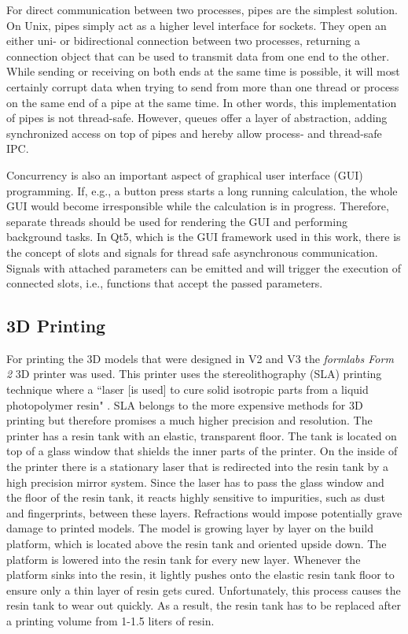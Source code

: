 \documentclass[12pt]{article}
\begin{document}
For direct communication between two processes, pipes are the simplest solution.
On Unix, pipes simply act as a higher level interface for sockets.
They open an either uni- or bidirectional connection between two processes,
returning a connection object that can be used to transmit data from one end to the other.
While sending or receiving on both ends at the same time is possible,
it will most certainly corrupt data when trying to send from more than one thread or process
on the same end of a pipe at the same time.
In other words, this implementation of pipes is not thread-safe.
However, queues offer a layer of abstraction, adding synchronized access on top of pipes
and hereby allow process- and thread-safe IPC.

Concurrency is also an important aspect of graphical user interface (GUI) programming.
If, e.g., a button press starts a long running calculation, the whole GUI would become irresponsible while the calculation is in progress.
Therefore, separate threads should be used for rendering the GUI and performing background tasks.
In Qt5, which is the GUI framework used in this work, there is the concept of slots and signals for thread safe asynchronous communication.
Signals with attached parameters can be emitted and will trigger the execution of connected slots, i.e., functions that accept the passed parameters.

\subsection{3D Printing}
For printing the 3D models that were designed in V2 and V3 the \textit{formlabs Form 2} 3D printer was used.
This printer uses the stereolithography (SLA) printing technique where a ``laser [is used] to cure solid isotropic parts from a liquid photopolymer resin" \cite{3dprinter}.
SLA belongs to the more expensive methods for 3D printing but therefore promises a much higher precision and resolution.
The printer has a resin tank with an elastic, transparent floor.
The tank is located on top of a glass window that shields the inner parts of the printer.
On the inside of the printer there is a stationary laser that is redirected into the resin tank 
by a high precision mirror system.
Since the laser has to pass the glass window and the floor of the resin tank, 
it reacts highly sensitive to impurities, such as dust and fingerprints, between these layers.
Refractions would impose potentially grave damage to printed models.
The model is growing layer by layer on the build platform, which is located above the resin tank and oriented upside down.
The platform is lowered into the resin tank for every new layer.
Whenever the platform sinks into the resin, it lightly pushes onto the elastic resin tank floor
to ensure only a thin layer of resin gets cured.
Unfortunately, this process causes the resin tank to wear out quickly. 
As a result, the resin tank has to be replaced after a printing volume from 1-1.5 liters of resin.
\end{document}
